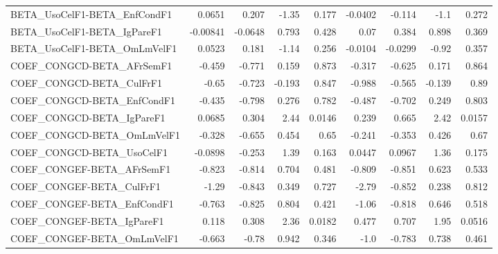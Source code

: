 \begin{tabular}{lrrrrrrrr}
BETA\_UsoCelF1-BETA\_EnfCondF1          &      0.0651 &        0.207 &   -1.35 &    0.177 &    -0.0402 &      -0.114 &         -1.1 &         0.272 \\
BETA\_UsoCelF1-BETA\_IgPareF1           &    -0.00841 &      -0.0648 &   0.793 &    0.428 &       0.07 &       0.384 &        0.898 &         0.369 \\
BETA\_UsoCelF1-BETA\_OmLmVelF1          &      0.0523 &        0.181 &   -1.14 &    0.256 &    -0.0104 &     -0.0299 &        -0.92 &         0.357 \\
COEF\_CONGCD-BETA\_AFrSemF1             &      -0.459 &       -0.771 &   0.159 &    0.873 &     -0.317 &      -0.625 &        0.171 &         0.864 \\
COEF\_CONGCD-BETA\_CulFrF1              &       -0.65 &       -0.723 &  -0.193 &    0.847 &     -0.988 &      -0.565 &       -0.139 &          0.89 \\
COEF\_CONGCD-BETA\_EnfCondF1            &      -0.435 &       -0.798 &   0.276 &    0.782 &     -0.487 &      -0.702 &        0.249 &         0.803 \\
COEF\_CONGCD-BETA\_IgPareF1             &      0.0685 &        0.304 &    2.44 &   0.0146 &      0.239 &       0.665 &         2.42 &        0.0157 \\
COEF\_CONGCD-BETA\_OmLmVelF1            &      -0.328 &       -0.655 &   0.454 &     0.65 &     -0.241 &      -0.353 &        0.426 &          0.67 \\
COEF\_CONGCD-BETA\_UsoCelF1             &     -0.0898 &       -0.253 &    1.39 &    0.163 &     0.0447 &      0.0967 &         1.36 &         0.175 \\
COEF\_CONGEF-BETA\_AFrSemF1             &      -0.823 &       -0.814 &   0.704 &    0.481 &     -0.809 &      -0.851 &        0.623 &         0.533 \\
COEF\_CONGEF-BETA\_CulFrF1              &       -1.29 &       -0.843 &   0.349 &    0.727 &      -2.79 &      -0.852 &        0.238 &         0.812 \\
COEF\_CONGEF-BETA\_EnfCondF1            &      -0.763 &       -0.825 &   0.804 &    0.421 &      -1.06 &      -0.818 &        0.646 &         0.518 \\
COEF\_CONGEF-BETA\_IgPareF1             &       0.118 &        0.308 &    2.36 &   0.0182 &      0.477 &       0.707 &         1.95 &        0.0516 \\
COEF\_CONGEF-BETA\_OmLmVelF1            &      -0.663 &        -0.78 &   0.942 &    0.346 &       -1.0 &      -0.783 &        0.738 &         0.461 \\

\end{tabular}
